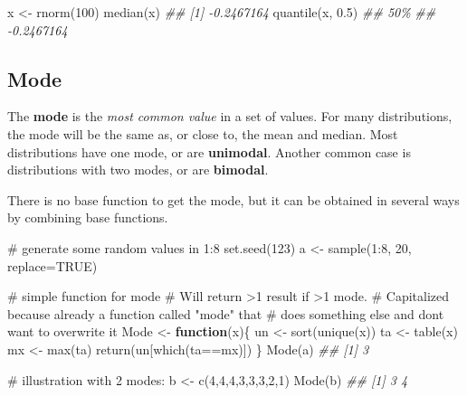 \documentclass[
  13,
  letterpaper,
]{report}
\newenvironment{Shaded}{\begin{snugshade}}{\end{snugshade}}
\newcommand{\AttributeTok}[1]{\textcolor[rgb]{0.40,0.45,0.13}{#1}}
\newcommand{\CommentTok}[1]{\textcolor[rgb]{0.37,0.37,0.37}{#1}}
\newcommand{\ConstantTok}[1]{\textcolor[rgb]{0.56,0.35,0.01}{#1}}
\newcommand{\ControlFlowTok}[1]{\textcolor[rgb]{0.00,0.23,0.31}{\textbf{#1}}}
\newcommand{\DecValTok}[1]{\textcolor[rgb]{0.68,0.00,0.00}{#1}}
\newcommand{\DocumentationTok}[1]{\textcolor[rgb]{0.37,0.37,0.37}{\textit{#1}}}
\newcommand{\FloatTok}[1]{\textcolor[rgb]{0.68,0.00,0.00}{#1}}
\newcommand{\FunctionTok}[1]{\textcolor[rgb]{0.28,0.35,0.67}{#1}}
\newcommand{\NormalTok}[1]{\textcolor[rgb]{0.00,0.23,0.31}{#1}}
\newcommand{\OtherTok}[1]{\textcolor[rgb]{0.00,0.23,0.31}{#1}}
\newcommand{\SpecialCharTok}[1]{\textcolor[rgb]{0.37,0.37,0.37}{#1}}
\begin{document}
\begin{Shaded}
\begin{Highlighting}[]
\NormalTok{x }\OtherTok{\textless{}{-}} \FunctionTok{rnorm}\NormalTok{(}\DecValTok{100}\NormalTok{)}
\FunctionTok{median}\NormalTok{(x)}
\DocumentationTok{\#\# [1] {-}0.2467164}
\FunctionTok{quantile}\NormalTok{(x, }\FloatTok{0.5}\NormalTok{)}
\DocumentationTok{\#\#        50\% }
\DocumentationTok{\#\# {-}0.2467164}
\end{Highlighting}
\end{Shaded}

\subsection{Mode}\label{sec-desc-cen-mode}

The \textbf{mode} is the \emph{most common value} in a set of values.
For many distributions, the mode will be the same as, or close to, the
mean and median. Most distributions have one mode, or are
\textbf{unimodal}. Another common case is distributions with two modes,
or are \textbf{bimodal}.

There is no base function to get the mode, but it can be obtained in
several ways by combining base functions.

\begin{Shaded}
\begin{Highlighting}[]

\CommentTok{\# generate some random values in 1:8}
\FunctionTok{set.seed}\NormalTok{(}\DecValTok{123}\NormalTok{)}
\NormalTok{a }\OtherTok{\textless{}{-}} \FunctionTok{sample}\NormalTok{(}\DecValTok{1}\SpecialCharTok{:}\DecValTok{8}\NormalTok{, }\DecValTok{20}\NormalTok{, }\AttributeTok{replace=}\ConstantTok{TRUE}\NormalTok{)}

\CommentTok{\# simple function for mode}
\CommentTok{\# Will return \textgreater{}1 result if \textgreater{}1 mode.}
\CommentTok{\# Capitalized because already a function called "mode" that}
\CommentTok{\# does something else and don\textquotesingle{}t want to overwrite it}
\NormalTok{Mode }\OtherTok{\textless{}{-}} \ControlFlowTok{function}\NormalTok{(x)\{}
\NormalTok{    un }\OtherTok{\textless{}{-}} \FunctionTok{sort}\NormalTok{(}\FunctionTok{unique}\NormalTok{(x))}
\NormalTok{    ta }\OtherTok{\textless{}{-}} \FunctionTok{table}\NormalTok{(x)}
\NormalTok{    mx }\OtherTok{\textless{}{-}} \FunctionTok{max}\NormalTok{(ta)}
    \FunctionTok{return}\NormalTok{(un[}\FunctionTok{which}\NormalTok{(ta}\SpecialCharTok{==}\NormalTok{mx)])}
\NormalTok{\}}
\FunctionTok{Mode}\NormalTok{(a)}
\DocumentationTok{\#\# [1] 3}

\CommentTok{\# illustration with 2 modes:}
\NormalTok{b }\OtherTok{\textless{}{-}} \FunctionTok{c}\NormalTok{(}\DecValTok{4}\NormalTok{,}\DecValTok{4}\NormalTok{,}\DecValTok{4}\NormalTok{,}\DecValTok{3}\NormalTok{,}\DecValTok{3}\NormalTok{,}\DecValTok{3}\NormalTok{,}\DecValTok{2}\NormalTok{,}\DecValTok{1}\NormalTok{)}
\FunctionTok{Mode}\NormalTok{(b)}
\DocumentationTok{\#\# [1] 3 4}
\end{Highlighting}
\end{Shaded}
\end{document}
